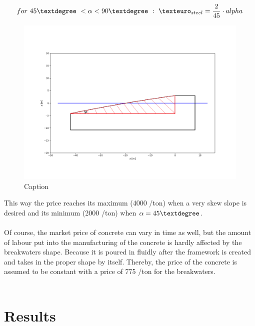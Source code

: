 \begin{equation}
        for ~ 45\textdegree~<\alpha<90\textdegree ~:~\texteuro_{steel} =\frac{2}{45} \cdot alpha
\end{equation}
\begin{figure}
    \centering
    \includegraphics[width=0.9\linewidth]{figures/Costs/breakwater_1.png}
    \caption{Caption}
    \label{fig: steel price breakwater}
\end{figure}
This way the price reaches its maximum (4000 \texteuro/ton) when a very skew slope is desired and its minimum (2000 \texteuro/ton) when $\alpha=45 \textdegree$. \\
\\




Of course, the market price of concrete can vary in time as well, but the amount of labour put into the manufacturing of the concrete is hardly affected by the breakwaters shape. Because it is poured in fluidly after the framework is created and takes in the proper shape by itself. Thereby, the price of the concrete is assumed to be constant with a price of 775 \texteuro/ton for the breakwaters. \\
\\

\section{Results}



